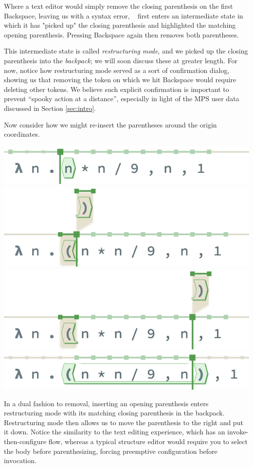Where a text editor would simply remove the closing parenthesis
on the first Backspace, leaving us with a syntax error,
\tylr~ first enters an intermediate state in which it has
"picked up" the closing parenthesis and highlighted the
matching opening parenthesis.
Pressing Backspace again then removes both parentheses.

This intermediate state is called \emph{restructuring mode},
and we picked up the closing parenthesis into the \emph{backpack};
we will soon discuss these at greater length.
For now, notice how restructuring mode served as a
sort of confirmation dialog, showing us that removing
the token on which we hit Backspace would require
deleting other tokens.
We believe such explicit confirmation is important to
prevent ``spooky action at a distance'', especially
in light of the MPS user data discussed in Section \ref{sec:intro}.

Now consider how we might re-insert the parentheses
around the origin coordinates.

\begin{center}
  \includegraphics[width=0.6\columnwidth]{img/insert-nonleaf-0.png}
  \includegraphics[width=0.6\columnwidth]{img/insert-nonleaf-1.png}
  \includegraphics[width=0.6\columnwidth]{img/insert-nonleaf-2.png}
  \includegraphics[width=0.6\columnwidth]{img/insert-nonleaf-3.png}
\end{center}

\noindent
In a dual fashion to removal, inserting
an opening parenthesis enters restructuring mode with its
matching closing parenthesis in the backpack.
Restructuring mode then allows us to move the parenthesis
to the right and put it down.
Notice the similarity to the text editing experience,
which has an invoke-then-configure flow, whereas a typical
structure editor would require you to select the body before
parenthesizing, forcing preemptive configuration before
invocation.

